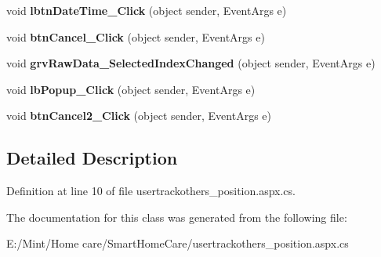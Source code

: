 \begin{DoxyCompactItemize}
\item 
\hypertarget{classusertrackothers__position_aeeeac53eb6cf278a27013d89267a418f}{void {\bfseries lbtn\-Date\-Time\-\_\-\-Click} (object sender, Event\-Args e)}\label{classusertrackothers__position_aeeeac53eb6cf278a27013d89267a418f}

\item 
\hypertarget{classusertrackothers__position_ad4d5a328d0d4987bf7e9c7d80dc9f9ed}{void {\bfseries btn\-Cancel\-\_\-\-Click} (object sender, Event\-Args e)}\label{classusertrackothers__position_ad4d5a328d0d4987bf7e9c7d80dc9f9ed}

\item 
\hypertarget{classusertrackothers__position_a234b607bfb2279eeee8b7ca214916177}{void {\bfseries grv\-Raw\-Data\-\_\-\-Selected\-Index\-Changed} (object sender, Event\-Args e)}\label{classusertrackothers__position_a234b607bfb2279eeee8b7ca214916177}

\item 
\hypertarget{classusertrackothers__position_a5bde3b6ae7c73f988dc3e76a864838b0}{void {\bfseries lb\-Popup\-\_\-\-Click} (object sender, Event\-Args e)}\label{classusertrackothers__position_a5bde3b6ae7c73f988dc3e76a864838b0}

\item 
\hypertarget{classusertrackothers__position_a5580bdbc4801b7998b08d8ab828bf121}{void {\bfseries btn\-Cancel2\-\_\-\-Click} (object sender, Event\-Args e)}\label{classusertrackothers__position_a5580bdbc4801b7998b08d8ab828bf121}

\end{DoxyCompactItemize}


\subsection{Detailed Description}


Definition at line 10 of file usertrackothers\-\_\-position.\-aspx.\-cs.



The documentation for this class was generated from the following file\-:\begin{DoxyCompactItemize}
\item 
E\-:/\-Mint/\-Home care/\-Smart\-Home\-Care/usertrackothers\-\_\-position.\-aspx.\-cs\end{DoxyCompactItemize}

